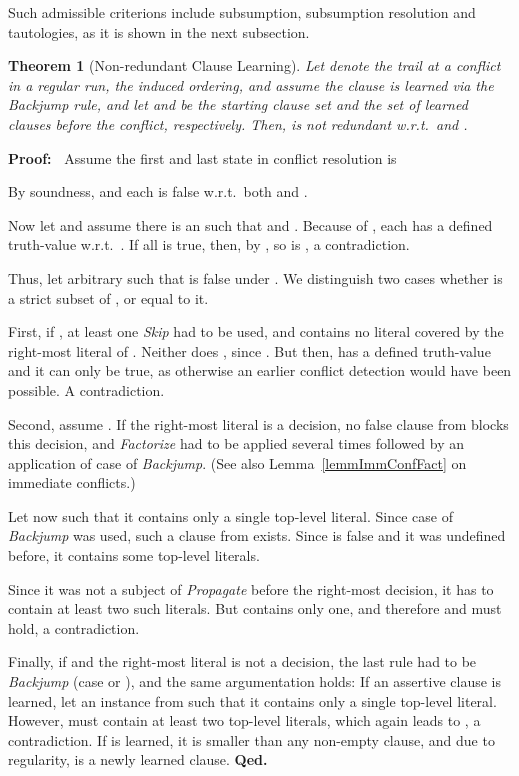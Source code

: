 \documentclass[a4paper]{article}
\newcommand{\startproof}{{\bf Proof:~}}
\newcommand{\finishproof}{{\bf Qed.}}
\newtheorem{theo}[defi]{Theorem}
\begin{document}
{Such admissible criterions include subsumption, subsumption resolution and tautologies, as it is shown in the next subsection. 

\begin{theo}[Non-redundant Clause Learning]\label{freshnessTheo}
Let  denote the trail at a conflict in a regular run,  the induced ordering, and 
assume the clause  is learned via the \emph{Backjump} rule, and 
let  and  be the starting clause set and the set of learned clauses before the conflict, respectively.
\leaveabit
Then,  is not redundant w.r.t.\
 and .
\end{theo}
\noindent
\startproof
Assume the first and last state in conflict resolution is 

By soundness,  
and each  is false w.r.t.\
both  and .

Now let  and assume there is an 
 such that  and .
Because of , each  has a defined truth-value w.r.t.\
. If all  is true, then, by , so is , a contradiction.

Thus, let  arbitrary such that  is false under .
We distinguish two cases whether  is a strict subset of , or equal to it.

First, if , at least one \emph{Skip} had to be used,  and  contains no literal covered by the 
right-most literal of . Neither does , since . But then,  has a defined truth-value and it 
can only be true, as otherwise an earlier conflict detection would have been possible. A contradiction.

Second, assume . 
If the right-most literal is a decision, no false clause from  blocks this decision, and  
\emph{Factorize} had to be applied several times followed by an application of case  of \emph{Backjump}. 
(See also Lemma~\ref{lemmImmConfFact} on immediate conflicts.)

Let now  such that it contains only a single top-level literal. 
Since case  of \emph{Backjump} was used, such a clause from  
exists. Since  is false and it was undefined before, 
it contains some top-level literals. 

Since it was not a subject of \emph{Propagate} before the right-most decision, 
it has to contain at least two such literals. 
But  contains only one, and therefore  and  must hold, a contradiction.

Finally, if  and the right-most literal is not a decision, the last rule had to be \emph{Backjump} (case  or ),
and the same argumentation holds: 
If an assertive clause is learned, let  an instance from  such that it contains only a single top-level literal. However,  
must contain at least two top-level literals, which again leads to , a contradiction.
If  is learned, it is smaller than any non-empty clause, and due to regularity,  is a newly learned clause.
\finishproof
}
\end{document}
